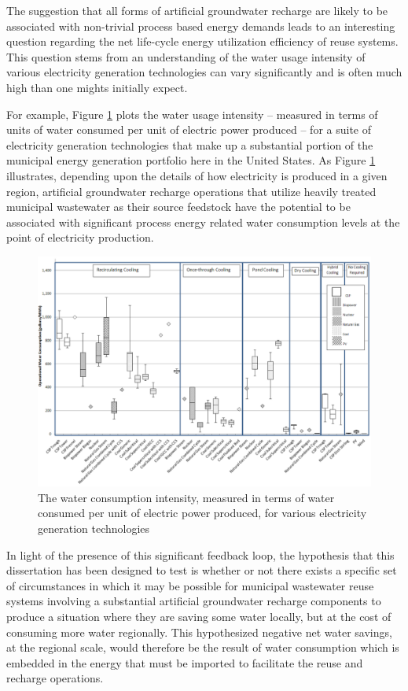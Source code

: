  The suggestion that all forms of artificial groundwater recharge are likely to be associated with non-trivial process based energy demands leads to an interesting question regarding the net life-cycle energy utilization efficiency of reuse systems. This question stems from an understanding of the water usage intensity of various electricity generation technologies can vary significantly and is often much high than one mights initially expect. 
 
For example, Figure \ref{fig:water-consumption-intensity} plots the water usage intensity -- measured in terms of units of water consumed per unit of electric power produced -- for a suite of electricity generation technologies that make up a substantial portion of the municipal energy generation portfolio here in the United States. As Figure \ref{fig:water-consumption-intensity} illustrates, depending upon the details of how electricity is produced in a given region, artificial groundwater recharge operations that utilize heavily treated municipal wastewater as their source feedstock have the potential to be associated with significant process energy related water consumption levels at the point of electricity production.
 
       \begin{figure}[!h]
           \centering
           \includegraphics[width=5.5in]{figures/water_consumption_for_energy.png}
           \caption[Water Intensity of Energy Production]{The water consumption intensity, measured in terms of water consumed per unit of electric power produced, for various electricity generation technologies}
           \label{fig:water-consumption-intensity}
       \end{figure}
        
In light of the presence of this significant feedback loop, the hypothesis that this dissertation has been designed to test is whether or not there exists a specific set of circumstances in which it may be possible for municipal wastewater reuse systems involving a substantial artificial groundwater recharge components to produce a situation where they are saving some water locally, but at the cost of consuming more water regionally. This hypothesized negative net water savings, at the regional scale, would therefore be the result of water consumption which is embedded in the energy that must be imported to facilitate the reuse and recharge operations.

\clearpage